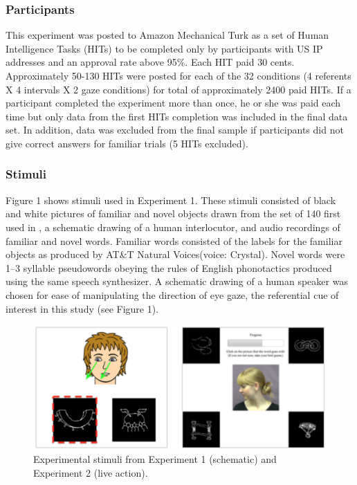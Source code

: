 \documentclass[10pt,letterpaper]{article}
\begin{document}
\subsubsection{Participants}

This experiment was posted to Amazon Mechanical Turk as a set of
Human Intelligence Tasks (HITs) to be completed only by participants with US IP
addresses and an approval rate above 95\%. Each HIT paid 30 cents. Approximately 50-130 HITs were posted for each of the 32 conditions (4 referents X 4 intervals X 2 gaze conditions) for total of approximately 2400 paid HITs. If a participant completed the experiment more than once, he or she was paid each time but only data from the first HITs completion was included in the final data set. In
addition, data was excluded from the final sample if participants did not give correct answers for familiar trials (5 HITs excluded).

\subsubsection{Stimuli}
Figure 1 shows stimuli used in Experiment 1. These stimuli consisted of black and white pictures of familiar and novel objects drawn from the set of 140 first used in , a schematic drawing of a human interlocutor, and audio recordings of familiar and novel words. 
Familiar words consisted of the labels for the familiar objects as produced by AT\&T Natural Voices\texttrademark (voice: Crystal). Novel words were 1--3 syllable pseudowords obeying the rules of English phonotactics produced using the same speech synthesizer. 
A schematic drawing of a human speaker was chosen for ease of manipulating the direction of eye gaze, the referential cue of interest in this study (see Figure 1). 

\begin{figure} [t!]
\begin{center}
\includegraphics[scale=0.38]{plots_figs/soc-xsit-stimuli.png}
\end{center}
\caption{Experimental stimuli from Experiment 1 (schematic) and Experiment 2 (live action).}
\end{figure}
\end{document}
